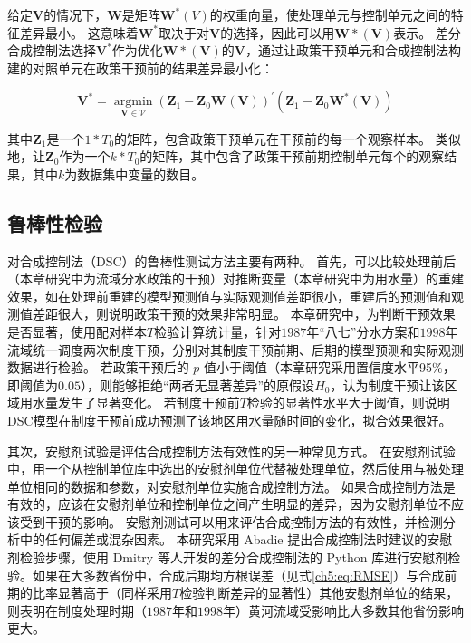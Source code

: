 给定$\mathbf{V}$的情况下，$\mathbf{W}$是矩阵$\mathbf{W}^{*}(V)$的权重向量，使处理单元与控制单元之间的特征差异最小。
这意味着$\mathbf{W^{*}}$取决于对$\mathbf{V}$的选择，因此可以用$\mathbf{W*(V)}$表示。
差分合成控制法选择$\mathbf{V^{*}}$作为优化$\mathbf{W*(V)}$的$\mathbf{V}$，通过让政策干预单元和合成控制法构建的对照单元在政策干预前的结果差异最小化：

\begin{equation}
    \mathbf{V}^{*}=\underset{\mathbf{V} \in \mathcal{V}}{\operatorname{argmin}}{\left(\mathbf{Z}_{1}-\mathbf{Z}_{0} \mathbf{W}^{}(\mathbf{V})\right)}^{\prime}{\left(\mathbf{Z}_{1}-\mathbf{Z}_{0} \mathbf{W}^{*}(\mathbf{V})\right)}
\end{equation}

其中$\mathbf{Z}_{1}$是一个$1*T_0$的矩阵，包含政策干预单元在干预前的每一个观察样本。
类似地，让$\mathbf{Z}_{0}$作为一个$k * T_0$的矩阵，其中包含了政策干预前期控制单元每个的观察结果，其中$k$为数据集中变量的数目。

\subsection{鲁棒性检验}

对合成控制法（DSC）的鲁棒性测试方法主要有两种。
首先，可以比较处理前后（本章研究中为流域分水政策的干预）对推断变量（本章研究中为用水量）的重建效果，如在处理前重建的模型预测值与实际观测值差距很小，重建后的预测值和观测值差距很大，则说明政策干预的效果非常明显。
本章研究中，为判断干预效果是否显著，使用配对样本$T$检验计算统计量，针对$1987$年“八七”分水方案和$1998$年流域统一调度两次制度干预，分别对其制度干预前期、后期的模型预测和实际观测数据进行检验。
若政策干预后的 $p$ 值小于阈值（本章研究采用置信度水平95\%，即阈值为$0.05$），则能够拒绝“两者无显著差异”的原假设$H_0$，认为制度干预让该区域用水量发生了显著变化。
若制度干预前$T$检验的显著性水平大于阈值，则说明DSC模型在制度干预前成功预测了该地区用水量随时间的变化，拟合效果很好。

其次，安慰剂试验是评估合成控制方法有效性的另一种常见方式。
在安慰剂试验中，用一个从控制单位库中选出的安慰剂单位代替被处理单位，然后使用与被处理单位相同的数据和参数，对安慰剂单位实施合成控制方法。
如果合成控制方法是有效的，应该在安慰剂单位和控制单位之间产生明显的差异，因为安慰剂单位不应该受到干预的影响。
安慰剂测试可以用来评估合成控制方法的有效性，并检测分析中的任何偏差或混杂因素。
本研究采用 Abadie 提出合成控制法时建议的安慰剂检验步骤\cite{abadie2010}，使用 Dmitry 等人开发的差分合成控制法的 Python 库进行安慰剂检验。如果在大多数省份中，合成后期均方根误差（见式\ref{ch5:eq:RMSE}）与合成前期的比率显著高于（同样采用$T$检验判断差异的显著性）其他安慰剂单位的结果，则表明在制度处理时期（$1987$年和$1998$年）黄河流域受影响比大多数其他省份影响更大。

